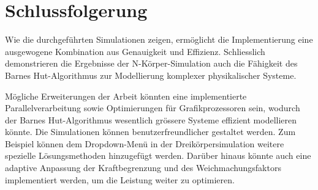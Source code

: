 \documentclass[a4paper,12pt,twoside]{article}
\begin{document}
\section{Schlussfolgerung}
Wie die durchgeführten Simulationen zeigen, ermöglicht 
die Implementierung eine ausgewogene Kombination aus Genauigkeit und Effizienz. 
Schliesslich demonstrieren die Ergebnisse der N-Körper-Simulation auch die Fähigkeit 
des Barnes Hut-Algorithmus zur Modellierung komplexer physikalischer Systeme. 

Mögliche Erweiterungen der Arbeit könnten eine implementierte Parallelverarbeitung 
sowie Optimierungen für Grafikprozessoren sein, wodurch der Barnes Hut-Algorithmus 
wesentlich grössere Systeme effizient modellieren könnte. Die Simulationen können 
benutzerfreundlicher gestaltet werden. Zum Beispiel können dem Dropdown-Menü in 
der Dreikörpersimulation weitere spezielle Lösungsmethoden hinzugefügt werden. 
Darüber hinaus könnte auch eine adaptive Anpassung der Kraftbegrenzung und des 
Weichmachungsfaktors implementiert werden, um die Leistung weiter zu optimieren.

\newpage
\end{document}
